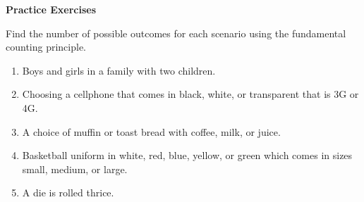 \textbf{Practice Exercises}

\vspce

Find the number of possible outcomes for each scenario using the fundamental counting principle. 
\begin{enumerate}[label = \arabic*. ]
\item Boys and girls in a family with two children.
\item Choosing a cellphone that comes in black, white, or transparent that is 3G or 4G.
\item A choice of muffin or toast bread with coffee, milk, or juice.
\item Basketball uniform in white, red, blue, yellow, or green which comes in sizes small, medium, or large.
\item A die is rolled thrice.

\end{enumerate}   
   